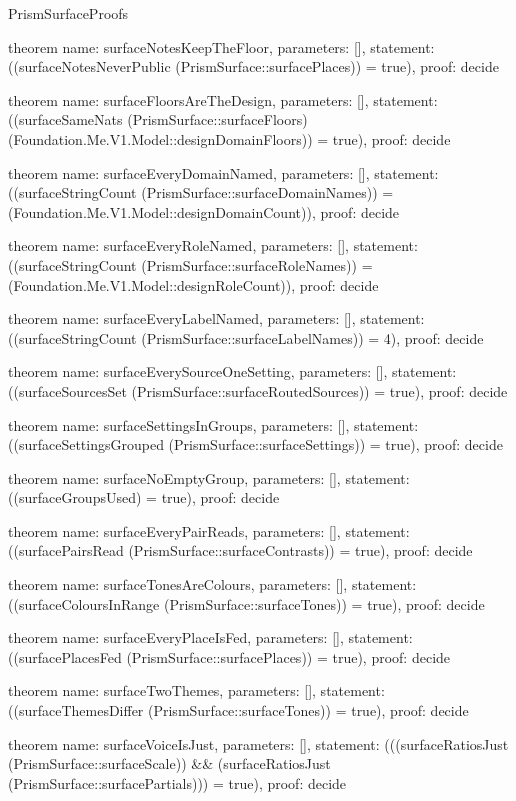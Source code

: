\begin{lexlean}{PrismSurfaceProofs}
\begin{semanticmodule}
theorem{
  name: surfaceNotesKeepTheFloor,
  parameters: [],
  statement: ((surfaceNotesNeverPublic (PrismSurface::surfacePlaces)) = true),
  proof: decide{}
}

theorem{
  name: surfaceFloorsAreTheDesign,
  parameters: [],
  statement: ((surfaceSameNats (PrismSurface::surfaceFloors) (Foundation.Me.V1.Model::designDomainFloors)) = true),
  proof: decide{}
}

theorem{
  name: surfaceEveryDomainNamed,
  parameters: [],
  statement: ((surfaceStringCount (PrismSurface::surfaceDomainNames)) = (Foundation.Me.V1.Model::designDomainCount)),
  proof: decide{}
}

theorem{
  name: surfaceEveryRoleNamed,
  parameters: [],
  statement: ((surfaceStringCount (PrismSurface::surfaceRoleNames)) = (Foundation.Me.V1.Model::designRoleCount)),
  proof: decide{}
}

theorem{
  name: surfaceEveryLabelNamed,
  parameters: [],
  statement: ((surfaceStringCount (PrismSurface::surfaceLabelNames)) = 4),
  proof: decide{}
}

theorem{
  name: surfaceEverySourceOneSetting,
  parameters: [],
  statement: ((surfaceSourcesSet (PrismSurface::surfaceRoutedSources)) = true),
  proof: decide{}
}

theorem{
  name: surfaceSettingsInGroups,
  parameters: [],
  statement: ((surfaceSettingsGrouped (PrismSurface::surfaceSettings)) = true),
  proof: decide{}
}

theorem{
  name: surfaceNoEmptyGroup,
  parameters: [],
  statement: ((surfaceGroupsUsed) = true),
  proof: decide{}
}

theorem{
  name: surfaceEveryPairReads,
  parameters: [],
  statement: ((surfacePairsRead (PrismSurface::surfaceContrasts)) = true),
  proof: decide{}
}

theorem{
  name: surfaceTonesAreColours,
  parameters: [],
  statement: ((surfaceColoursInRange (PrismSurface::surfaceTones)) = true),
  proof: decide{}
}

theorem{
  name: surfaceEveryPlaceIsFed,
  parameters: [],
  statement: ((surfacePlacesFed (PrismSurface::surfacePlaces)) = true),
  proof: decide{}
}

theorem{
  name: surfaceTwoThemes,
  parameters: [],
  statement: ((surfaceThemesDiffer (PrismSurface::surfaceTones)) = true),
  proof: decide{}
}

theorem{
  name: surfaceVoiceIsJust,
  parameters: [],
  statement: (((surfaceRatiosJust (PrismSurface::surfaceScale)) && (surfaceRatiosJust (PrismSurface::surfacePartials))) = true),
  proof: decide{}
}


\end{semanticmodule}
\end{lexlean}
